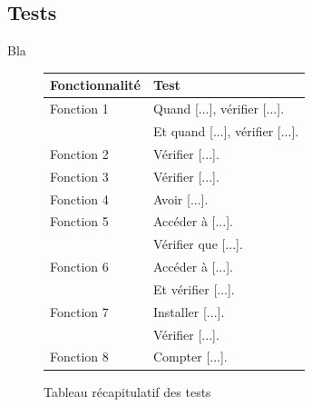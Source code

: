 \subsection{Tests}

Bla\\

\begin{figure}[!h]
\begin{center}
\begin{tabularx}{17cm}{|p{6cm}|X|}
  \hline
  Fonctionnalité & Test\\
  \hline
  Fonction 1 & Quand [...], vérifier [...]. \tabularnewline
  & Et quand [...], vérifier [...]. \tabularnewline
  Fonction 2 & Vérifier [...]. \tabularnewline
  Fonction 3 & Vérifier [...]. \tabularnewline
  Fonction 4 & Avoir [...]. \tabularnewline
  Fonction 5 & Accéder à [...]. \tabularnewline
   & Vérifier que [...]. \tabularnewline
  Fonction 6 & Accéder à [...]. \tabularnewline
   & Et vérifier [...]. \tabularnewline
  Fonction 7 & Installer [...]. \tabularnewline
   & Vérifier [...]. \tabularnewline
  Fonction 8 & Compter [...]. \tabularnewline
  \hline
\end{tabularx}
\end{center}
\caption{Tableau récapitulatif des tests}
\end{figure}
